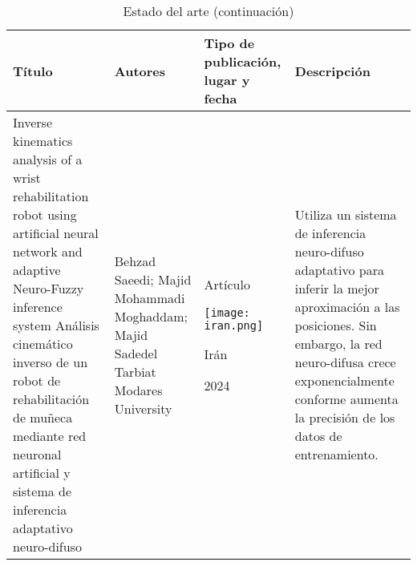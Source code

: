 \newpage
\begin{table}[htb]
	\caption{Estado del arte (continuación)}
	\centering
	\begin{tabular}{p{5cm}p{4cm}p{3.6cm}p{4cm}}
		\textbf{Título} & \textbf{Autores} & \textbf{Tipo de publicación, lugar y fecha} & \textbf{Descripción} \\ 
		\midrule
		Inverse kinematics analysis of a wrist rehabilitation robot using artificial neural network and adaptive Neuro-Fuzzy inference system \cite{estado3} \newline\newline
		Análisis cinemático inverso de un robot de rehabilitación de muñeca mediante red neuronal artificial y sistema de inferencia adaptativo neuro-difuso &  
		Behzad Saeedi; Majid Mohammadi Moghaddam; Majid Sadedel \newline\newline 
		Tarbiat Modares University & 
		\begin{center}Artículo \par \texttt{[image: iran.png]} \par Irán \par 2024\end{center} & 
		Utiliza un sistema de inferencia neuro-difuso adaptativo para inferir la mejor aproximación a las posiciones. \newline\newline Sin embargo, la red neuro-difusa crece exponencialmente conforme aumenta la precisión de los datos de entrenamiento. \\
	\end{tabular}
\end{table}
